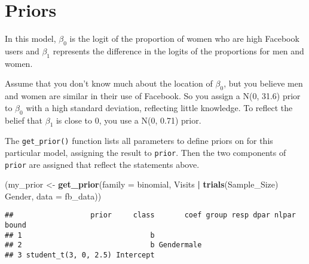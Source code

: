 \documentclass[
]{book}
\newenvironment{Shaded}{\begin{snugshade}}{\end{snugshade}}
\newcommand{\DataTypeTok}[1]{\textcolor[rgb]{0.13,0.29,0.53}{#1}}
\newcommand{\DecValTok}[1]{\textcolor[rgb]{0.00,0.00,0.81}{#1}}
\newcommand{\KeywordTok}[1]{\textcolor[rgb]{0.13,0.29,0.53}{\textbf{#1}}}
\newcommand{\NormalTok}[1]{#1}
\newcommand{\OperatorTok}[1]{\textcolor[rgb]{0.81,0.36,0.00}{\textbf{#1}}}
\newcommand{\StringTok}[1]{\textcolor[rgb]{0.31,0.60,0.02}{#1}}
\begin{document}
\hypertarget{priors}{%
\section{Priors}\label{priors}}

In this model, \(\beta_0\) is the logit of the proportion of women who are high Facebook users and \(\beta_1\) represents the difference in the logits of the proportions for men and women.

Assume that you don't know much about the location of \(\beta_0\), but you believe men and women are similar in their use of Facebook. So you assign a N(0, 31.6) prior to \(\beta_0\) with a high standard deviation, reflecting little knowledge. To reflect the belief that \(\beta_1\) is close to 0, you use a N(0, 0.71) prior.

The \texttt{get\_prior()} function lists all parameters to define priors on for this particular model, assigning the result to \texttt{prior}. Then the two components of \texttt{prior} are assigned that reflect the statements above.

\begin{Shaded}
\begin{Highlighting}[]
\NormalTok{(my_prior <-}\StringTok{ }\KeywordTok{get_prior}\NormalTok{(}\DataTypeTok{family =}\NormalTok{ binomial,}
\NormalTok{           Visits }\OperatorTok{|}\StringTok{ }\KeywordTok{trials}\NormalTok{(Sample_Size) }\OperatorTok{~}\StringTok{ }\NormalTok{Gender,}
           \DataTypeTok{data =}\NormalTok{ fb_data))}
\end{Highlighting}
\end{Shaded}

\begin{verbatim}
##                  prior     class       coef group resp dpar nlpar bound
## 1                              b                                       
## 2                              b Gendermale                            
## 3 student_t(3, 0, 2.5) Intercept
\end{verbatim}

\begin{Shaded}
\end{Shaded}
\end{document}
